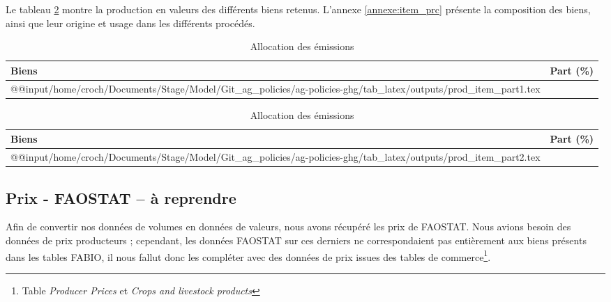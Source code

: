 Le tableau \ref{tab:prod_item} montre la production en valeurs des différents biens retenus. L'annexe \ref{annexe:item_prc} présente la composition des biens, ainsi que leur origine et usage dans les différents procédés.


\begin{table}[h]
    \centering
    \begin{threeparttable}
        \begin{minipage}[t]{0.49\textwidth}
            \centering
            \begin{tabularx}{\textwidth}{p{1.8in}c}
                \textbf{Biens} & \textbf{Part (\%)} \\ \hline
                \csname @@input\endcsname /home/croch/Documents/Stage/Model/Git_ag_policies/ag-policies-ghg/tab_latex/outputs/prod_item_part1.tex
                \hline
            \end{tabularx}
        \end{minipage}
        \begin{minipage}[t]{0.49\textwidth}
            \centering
            \begin{tabularx}{\textwidth}{p{2in}c}
                \textbf{Biens} & \textbf{Part (\%)}                                                                                               \\ \hline
                \csname @@input\endcsname /home/croch/Documents/Stage/Model/Git_ag_policies/ag-policies-ghg/tab_latex/outputs/prod_item_part2.tex \\
                \hline
            \end{tabularx}
        \end{minipage}
        \caption{Allocation des émissions}
        \label{tab:prod_item}
    \end{threeparttable}
\end{table}


\subsection{Prix - FAOSTAT \textbf{-- à reprendre}}\label{subsec:prix}

Afin de convertir nos données de volumes en données de valeurs, nous avons récupéré les prix de FAOSTAT. Nous avions besoin des données de prix producteurs ; cependant, les données FAOSTAT sur ces derniers ne correspondaient pas entièrement aux biens présents dans les tables FABIO, il nous fallut donc les compléter avec des données de prix issues des tables de commerce\footnote{Table \textit{Producer Prices} et \textit{Crops and livestock products}}.

